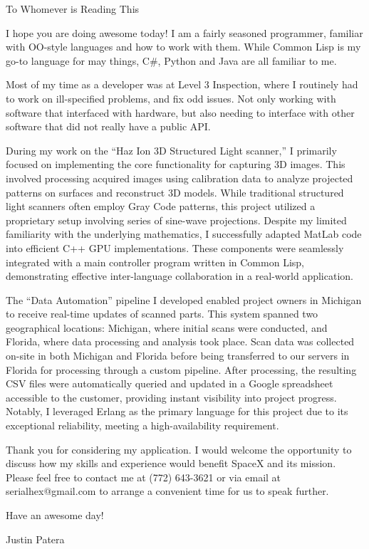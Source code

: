 
To Whomever is Reading This

\smallskip

I hope you are doing awesome today!
I am a fairly seasoned programmer, familiar with OO-style languages and how to work with them.
While Common Lisp is my go-to language for may things, C\#, Python and Java are all familiar to me.

\smallskip

Most of my time as a developer was at Level 3 Inspection, where I routinely had to work on ill-specified problems, and fix odd issues.
Not only working with software that interfaced with hardware, but also needing to interface with other software that did not really have a public API.

\smallskip

During my work on the ``Haz Ion 3D Structured Light scanner,'' I primarily focused on implementing the core functionality for capturing 3D images.
This involved processing acquired images using calibration data to analyze projected patterns on surfaces and reconstruct 3D models.
While traditional structured light scanners often employ Gray Code patterns, this project utilized a proprietary setup involving series of sine-wave projections.
Despite my limited familiarity with the underlying mathematics, I successfully adapted MatLab code into efficient C++ GPU implementations.
These components were seamlessly integrated with a main controller program written in Common Lisp, demonstrating effective inter-language collaboration in a real-world application.

\smallskip

The ``Data Automation'' pipeline I developed enabled project owners in Michigan to receive real-time updates of scanned parts.
This system spanned two geographical locations: Michigan, where initial scans were conducted, and Florida, where data processing and analysis took place.
Scan data was collected on-site in both Michigan and Florida before being transferred to our servers in Florida for processing through a custom pipeline.
After processing, the resulting CSV files were automatically queried and updated in a Google spreadsheet accessible to the customer, providing instant visibility into project progress.
Notably, I leveraged Erlang as the primary language for this project due to its exceptional reliability, meeting a high-availability requirement.

\smallskip

Thank you for considering my application.
I would welcome the opportunity to discuss how my skills and experience would benefit SpaceX and its mission.
Please feel free to contact me at (772) 643-3621 or via email at serialhex@gmail.com to arrange a convenient time for us to speak further.

\smallskip

Have an awesome day!

Justin Patera
